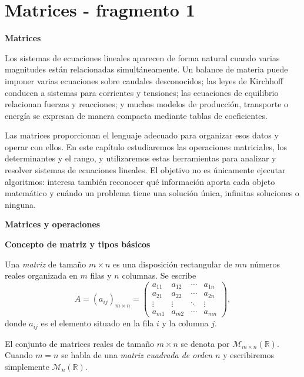
\section{Matrices - fragmento 1}
\textbf{Matrices}

Los sistemas de ecuaciones lineales aparecen de forma natural cuando varias magnitudes están relacionadas simultáneamente. Un balance de materia puede imponer varias ecuaciones sobre caudales desconocidos; las leyes de Kirchhoff conducen a sistemas para corrientes y tensiones; las ecuaciones de equilibrio relacionan fuerzas y reacciones; y muchos modelos de producción, transporte o energía se expresan de manera compacta mediante tablas de coeficientes.

Las matrices proporcionan el lenguaje adecuado para organizar esos datos y operar con ellos. En este capítulo estudiaremos las operaciones matriciales, los determinantes y el rango, y utilizaremos estas herramientas para analizar y resolver sistemas de ecuaciones lineales. El objetivo no es únicamente ejecutar algoritmos: interesa también reconocer qué información aporta cada objeto matemático y cuándo un problema tiene una solución única, infinitas soluciones o ninguna.

\textbf{Matrices y operaciones}

\textbf{Concepto de matriz y tipos básicos}

\begin{definition}[Matriz]
Una \emph{matriz} de tamaño $m\times n$ es una disposición rectangular de $mn$ números reales organizada en $m$ filas y $n$ columnas. Se escribe
\[
A=(a_{ij})_{m\times n}
=
\begin{pmatrix}
 a_{11}&a_{12}&\cdots&a_{1n}\\
 a_{21}&a_{22}&\cdots&a_{2n}\\
 \vdots&\vdots&\ddots&\vdots\\
 a_{m1}&a_{m2}&\cdots&a_{mn}
\end{pmatrix},
\]
donde $a_{ij}$ es el elemento situado en la fila $i$ y la columna $j$.
\end{definition}

El conjunto de matrices reales de tamaño $m\times n$ se denota por $\mathcal M_{m\times n}(\mathbb{R})$. Cuando $m=n$ se habla de una \emph{matriz cuadrada de orden $n$} y escribiremos simplemente $\mathcal M_n(\mathbb{R})$.


